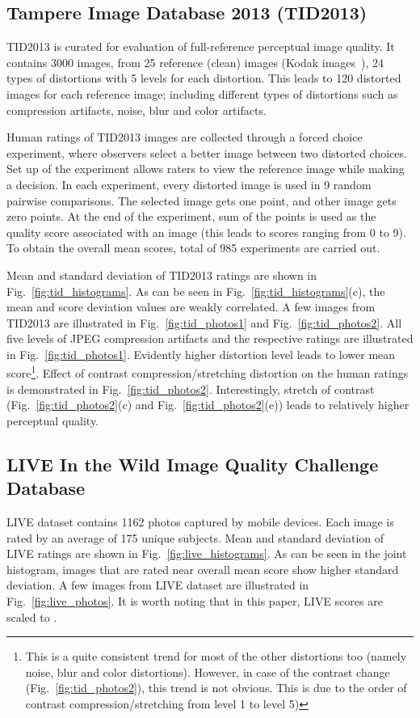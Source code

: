 \documentclass[10pt,twocolumn,twoside]{IEEEtran}
\begin{document}
 \subsection{Tampere Image Database 2013 (TID2013) \cite{ponomarenko2013color}}
TID2013 is curated for evaluation of full-reference perceptual image quality. It contains 3000 images, from 25 reference (clean) images (Kodak images~\cite{kodak_dataset}), 24 types of distortions with 5 levels for each distortion. This leads to 120 distorted images for each reference image; including different types of distortions such as compression artifacts, noise, blur and color artifacts. 

Human ratings of TID2013 images are collected through a forced choice experiment, where observers select a better image between two distorted choices. Set up of the experiment allows raters to view the reference image while making a decision. In each experiment, every distorted image is used in 9 random pairwise comparisons. The selected image gets one point, and other image gets zero points. At the end of the experiment, sum of the points is used as the quality score associated with an image (this leads to scores ranging from 0 to 9). To obtain the overall mean scores, total of 985 experiments are carried out.

Mean and standard deviation of TID2013 ratings are shown in Fig.~\ref{fig:tid_histograms}. As can be seen in Fig.~\ref{fig:tid_histograms}(c), the mean and score deviation values are weakly correlated. A few images from TID2013 are illustrated in Fig.~\ref{fig:tid_photos1} and Fig.~\ref{fig:tid_photos2}. All five levels of JPEG compression artifacts and the respective ratings are illustrated in Fig.~\ref{fig:tid_photos1}. Evidently higher distortion level leads to lower mean score\footnote{This is a quite consistent trend for most of the other distortions too (namely noise, blur and color distortions). However, in case of the contrast change (Fig.~\ref{fig:tid_photos2}), this trend is not obvious. This is due to the order of contrast compression/stretching from level 1 to level 5)}. Effect of contrast compression/stretching distortion on the human ratings is demonstrated in Fig.~\ref{fig:tid_photos2}. Interestingly, stretch of contrast (Fig.~\ref{fig:tid_photos2}(c) and Fig.~\ref{fig:tid_photos2}(e)) leads to relatively higher perceptual quality.

 \subsection{LIVE In the Wild Image Quality Challenge Database \cite{ghadiyaram2016massive}}
LIVE dataset contains 1162 photos captured by mobile devices. Each image is rated by an average of 175 unique subjects. Mean and standard deviation of LIVE ratings are shown in Fig.~\ref{fig:live_histograms}. As can be seen in the joint histogram, images that are rated near overall mean score show higher standard deviation.  A few images from LIVE dataset are illustrated in Fig.~\ref{fig:live_photos}. It is worth noting that in this paper, LIVE scores are scaled to .
\end{document}
